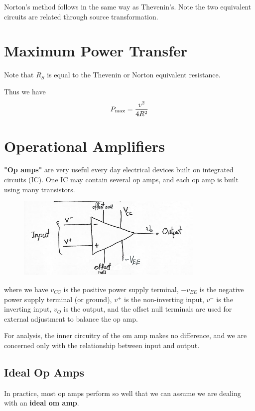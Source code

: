 \documentclass[12pt]{article}
\begin{document}
Norton's method follows in the same way as Thevenin's. Note the two equivalent circuits are related through source transformation.

\section*{Maximum Power Transfer}

Note that $R_S$ is equal to the Thevenin or Norton equivalent resistance.

Thus we have \[ P_{{\rm max}} = \frac{v^2}{4R^2} \]

\section*{Operational Amplifiers}
{\bf "Op amps"} are very useful every day electrical devices built on integrated circuits (IC). One IC may contain several op amps, and each op amp is built using many transistors.

\begin{figure}[ht]
\centering
\includegraphics[width=0.8\textwidth]{opamp.png}
\end{figure}

where we have $v_{CC}$ is the positive power supply terminal, $-v_{EE}$ is the negative power supply terminal (or ground), $v^+$ is the non-inverting input, $v^-$ is the inverting input, $v_O$ is the output, and the offset null terminals are used for external adjustment to balance the op amp.

For analysis, the inner circuitry of the om amp makes no difference, and we are concerned only with the relationship between input and output.

\subsection*{Ideal Op Amps}
In practice, most op amps perform so well that we can assume we are dealing with an {\bf ideal om amp}.
\end{document}
